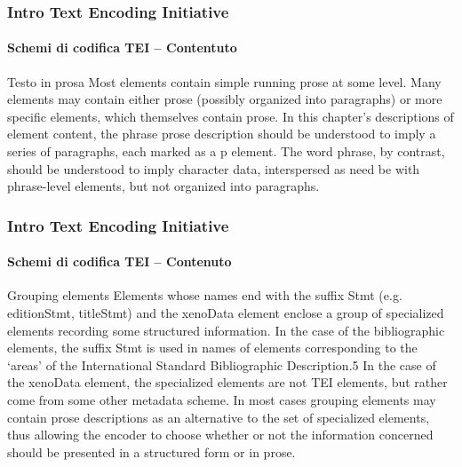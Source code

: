 \begin{frame}
	\frametitle{Intro Text Encoding Initiative}
	\framesubtitle{Schemi di codifica TEI – Contentuto}
	\addtocounter{nframe}{1}

    \begin{block}{Testo in prosa}
        Most elements contain simple running prose at some level. Many elements may contain either prose (possibly organized into paragraphs) or more specific elements, which themselves contain prose. In this chapter's descriptions of element content, the phrase prose description should be understood to imply a series of paragraphs, each marked as a p element. The word phrase, by contrast, should be understood to imply character data, interspersed as need be with phrase-level elements, but not organized into paragraphs.
    \end{block}
\textit{}

\end{frame}


\begin{frame}
	\frametitle{Intro Text Encoding Initiative}
	\framesubtitle{Schemi di codifica TEI – Contenuto}
	\addtocounter{nframe}{1}

    \begin{block}{Grouping elements}
        Elements whose names end with the suffix Stmt (e.g. editionStmt, titleStmt) and the xenoData element enclose a group of specialized elements recording some structured information. In the case of the bibliographic elements, the suffix Stmt is used in names of elements corresponding to the ‘areas’ of the International Standard Bibliographic Description.5 In the case of the xenoData element, the specialized elements are not TEI elements, but rather come from some other metadata scheme. In most cases grouping elements may contain prose descriptions as an alternative to the set of specialized elements, thus allowing the encoder to choose whether or not the information concerned should be presented in a structured form or in prose.
    \end{block}
\textit{}

\end{frame}


